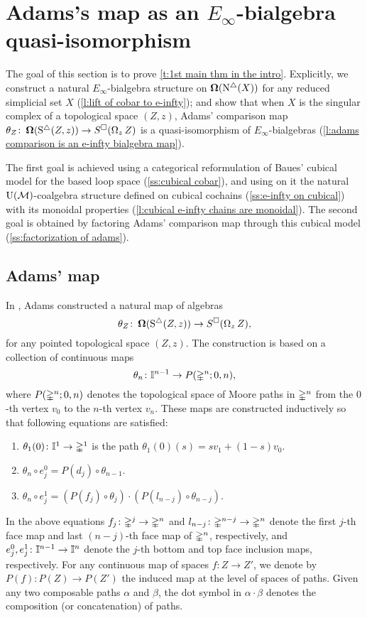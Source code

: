 
\section{Adams's map as an \texorpdfstring{$E_{\infty}$}{}-bialgebra quasi-isomorphism}

The goal of this section is to prove \cref{t:1st main thm in the intro}.
Explicitly, we construct a natural $E_{\infty}$-bialgebra structure on $\operatorname{\mathbf{\Omega}}(\operatorname{N^{\triangle}}(X))$ for any reduced simplicial set $X$ (\cref{l:lift of cobar to e-infty}); and show that when $X$ is the singular complex of a topological space $(Z, z)$, Adams' comparison map $\theta_Z \colon \operatorname{\mathbf{\Omega}}(\operatorname{S^{\triangle}}(Z, z)) \to S^{\square}(\operatorname{\Omega}_z Z)$ is a quasi-isomorphism of $E_\infty$-bialgebras (\cref{l:adams comparison is an e-infty bialgebra map}).

The first goal is achieved using a categorical reformulation of Baues' cubical model for the based loop space (\cref{ss:cubical cobar}), and using on it the natural ${\operatorname{U}(\mathcal{M})}$-coalgebra structure defined on cubical cochains (\cref{ss:e-infty on cubical}) with its monoidal properties (\cref{l:cubical e-infty chains are monoidal}).
The second goal is obtained by factoring Adams' comparison map through this cubical model (\cref{ss:factorization of adams}).

\subsection{Adams' map}

In \cite{adams1956cobar}, Adams constructed a natural map of algebras
\begin{equation} \label{e:adams map 2}
\theta_Z \colon \operatorname{\mathbf{\Omega}}(\operatorname{S^{\triangle}}(Z, z)) \to S^{\square}(\operatorname{\Omega}_z Z),
\end{equation}
for any pointed topological space $(Z, z)$.
The construction is based on a collection of continuous maps 
\[
\theta_n \colon \mathbb{I}^{n-1} \to P(\mathbb{\Delta}^n;0,n),
\]
where $P(\mathbb{\Delta}^n;0,n)$ denotes the topological space of Moore paths in $\mathbb{\Delta}^n$ from the $0$-th vertex $v_0$ to the $n$-th vertex $v_n$.
These maps are constructed inductively so that following equations are satisfied:
\begin{enumerate}
	\item $\theta_1(0)\colon \mathbb{I}^1 \to \mathbb{\Delta}^1$ is the path $\theta_1(0)(s) = sv_1 +(1-s)v_0$.
	\item $\theta_n \circ e_j^0 = P(d_j) \circ \theta_{n-1}$.
	\item $\theta_n \circ e_j^1 = (P(f_j) \circ \theta_j) \cdot (P(l_{n-j}) \circ \theta_{n-j})$.
\end{enumerate}
In the above equations $f_j\colon \mathbb{\Delta}^j \rightarrow \mathbb{\Delta}^n$ and $l_{n-j}\colon \mathbb{\Delta}^{n-j} \rightarrow \mathbb{\Delta}^n$ denote the first $j$-th face map and last $(n-j)$-th face map of $\mathbb{\Delta}^n$, respectively, and
$e_j^0,e_j^1\colon \mathbb{I}^{n-1} \rightarrow \mathbb{I}^{n}$ denote the $j$-th bottom and top face inclusion maps, respectively.
For any continuous map of spaces $f \colon Z \to Z'$, we denote by $P(f) \colon P(Z) \to P(Z')$ the induced map at the level of spaces of paths. Given any two composable paths $\alpha$ and $\beta$, the dot symbol in $\alpha \cdot \beta$ denotes the composition (or concatenation) of paths.

